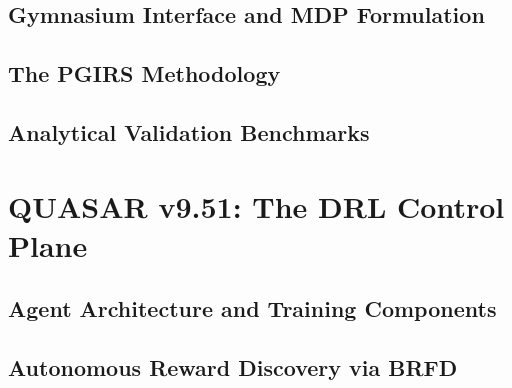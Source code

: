 \documentclass[twocolumn]{article}
\begin{document}
\subsection{Gymnasium Interface and MDP Formulation}

\subsection{The PGIRS Methodology}

\subsection{Analytical Validation Benchmarks}

%
\section{QUASAR v9.51: The DRL Control Plane}

\subsection{Agent Architecture and Training Components}

\subsection{Autonomous Reward Discovery via BRFD}
\end{document}
